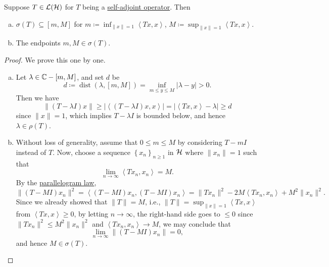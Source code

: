 \begin{theorem}\label{thm:lec23}
	Suppose \(T \in \mathcal{\MakeUppercase{l}} (\mathcal{\MakeUppercase{h}} )\) for \(T\) being a \hyperref[def:self-adjoint-op]{self-adjoint operator}. Then
	\begin{enumerate}[(a)]
		\item \(\sigma (T) \subseteq [m, M]\) for \(m\coloneqq \inf _{\lVert x \rVert = 1}\left\langle Tx, x \right\rangle \), \(M\coloneqq \sup _{\lVert x \rVert = 1} \left\langle Tx, x \right\rangle \).
		\item The endpoints \(m, M\in \sigma (T)\).
	\end{enumerate}
\end{theorem}
\begin{proof}
	We prove this one by one.
	\begin{enumerate}[(a)]
		\item Let \(\lambda \in \mathbb{\MakeUppercase{c}} -[m, M]\), and set \(d\) be
		      \[
			      d\coloneqq \mathop{\mathrm{dist}}(\lambda , [m, M])
			      = \inf _{m \leq y\leq M} \vert \lambda -y \vert > 0.
		      \]
		      Then we have
		      \[
			      \lVert (T-\lambda I)x \rVert
			      \geq \vert \left\langle (T-\lambda I)x, x \right\rangle  \vert
			      = \vert \left\langle Tx, x \right\rangle - \lambda  \vert
			      \geq d
		      \]
		      since \(\lVert x \rVert = 1\), which implies \(T - \lambda I\) is bounded below, and hence \(\lambda \in \rho (T)\).
		\item Without loss of generality, assume that \(0 \leq m \leq M\) by considering \(T - mI\) instead of \(T\). Now, choose a sequence \(\left\{ x_n \right\} _{n\geq 1}\) in \(\mathcal{\MakeUppercase{h}} \) where \(\lVert x_n \rVert = 1\) such that
		      \[
			      \lim_{n \to \infty} \left\langle Tx_n, x_n \right\rangle = M.
		      \]
		      By the \hyperref[lma:parallelogram-law]{parallelogram law},
		      \[
			      \lVert (T-MI)x_n \rVert ^{2}
			      = \left\langle (T-MI)x_n, (T-MI)x_n \right\rangle
			      = \lVert Tx_n \rVert ^2 - 2M\left\langle Tx_n, x_n \right\rangle + M^{2} \lVert x_n \rVert ^{2}.
		      \]
		      Since we already showed that \(\lVert T \rVert = M\), i.e., \(\lVert T \rVert = \sup _{\lVert x \rVert = 1}\left\langle Tx, x \right\rangle \) from \(\left\langle Tx, x \right\rangle \geq 0\), by letting \(n \to \infty \), the right-hand side goes to \(\leq 0\) since \(\lVert Tx_n \rVert ^{2} \leq M^{2} \lVert x_n \rVert ^{2} \) and \(\left\langle Tx_n, x_n \right\rangle \to M\), we may conclude that
		      \[
			      \lim_{n \to \infty} \lVert (T-MI)x_n \rVert = 0,
		      \]
		      and hence \(M\in \sigma (T)\).
	\end{enumerate}
\end{proof}

